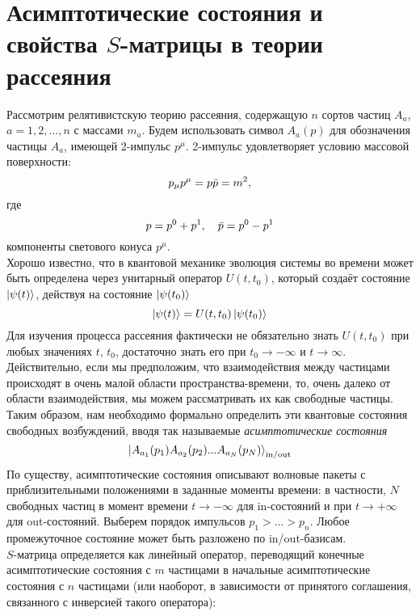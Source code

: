 \documentclass[12pt]{article}
\theoremstyle{definition}
\begin{document}
\section{Асимптотические состояния и свойства $S$-матрицы в теории рассеяния}
Рассмотрим релятивистскую теорию рассеяния, содержащую $n$ сортов частиц $A_a$, $a = 1, 2, ..., n$ с массами $m_a$. Будем использовать символ $A_a(p)$ для обозначения частицы $A_a$, имеющей 2-импульс $p^\mu$. 2-импульс удовлетворяет условию массовой поверхности:
\begin{equation}
    p_\mu p^\mu=p\Bar{p}=m^2,
\end{equation}
где
\begin{equation}\label{eq5}
    p=p^0+p^1,\quad\Bar{p}=p^0-p^1
\end{equation}
компоненты светового конуса $p^\mu$.\\
Хорошо известно, что в квантовой механике эволюция системы во времени может быть определена через унитарный оператор $U(t,t_0)$, который создаёт состояние $\ket{\psi(t)}$, действуя на состояние $\ket{\psi(t_0)}$
\begin{equation}
    \ket{\psi(t)}=U(t,t_0)\ket{\psi(t_0)}
\end{equation}
Для изучения процесса рассеяния фактически не обязательно знать $U(t,t_0)$ при любых значениях $t$, $t_0$, достаточно знать его при $t_0\rightarrow-\infty$ и $t\rightarrow\infty$. Действительно, если мы предположим, что взаимодействия между частицами происходят в очень малой области пространства-времени, то, очень далеко от области взаимодействия, мы можем рассматривать их как свободные частицы. Таким образом, нам необходимо формально определить эти квантовые состояния свободных возбуждений, вводя так называемые \textit{асимптотические состояния}
\begin{equation}\label{eq4}
    \ket{A_{a_1}(p_1)A_{a_2}(p_2)...A_{a_N}(p_N)}_{\text{in}/\text{out}}
\end{equation}
По существу, асимптотические состояния описывают волновые пакеты с приблизительными положениями в заданные моменты времени: в частности, $N$ свободных частиц в момент времени $t\rightarrow-\infty$ для in-состояний и при $t\rightarrow+\infty$ для out-состояний. Выберем порядок импульсов $p_1>...>p_n$. Любое промежуточное состояние может быть разложено по in/out-базисам.\\
$S$-матрица определяется как линейный оператор, переводящий конечные асимптотические состояния с $m$ частицами в начальные асимптотические состояния с $n$ частицами (или наоборот, в зависимости от принятого соглашения, связанного с инверсией такого оператора):
\end{document}
